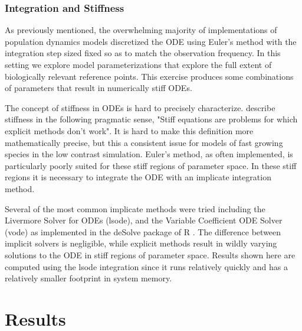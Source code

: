 \documentclass[12pt]{article}
\begin{document}
%
\subsubsection{Integration and Stiffness}

%
As previously mentioned, the overwhelming majority of implementations of
population dynamics models discretized the ODE using Euler's method with the
integration step sized fixed so as to match the observation frequency. In this
setting we explore model parameterizations that explore the full extent of
biologically relevant reference points. This exercise produces some
combinations of parameters that result in numerically stiff ODEs.

%
The concept of stiffness in ODEs is hard to precisely characterize.
 describe stiffness in the
following pragmatic sense, "Stiff equations are problems for which explicit
methods don't work". It is hard to make this definition more mathematically
precise, but this a consistent issue for models of fast growing species in 
the low contrast simulation. 
Euler's method, as often implemented, is particularly poorly suited for these 
stiff regions of parameter space. In these stiff regions it is necessary to 
integrate the ODE with an implicate integration method.

%
Several of the most common implicate methods were tried including the
Livermore Solver for ODEs (lsode), and the Variable Coefficient ODE Solver
(vode) as implemented in the deSolve package of R . 
The difference between implicit solvers is negligible, while explicit
methods result in wildly varying solutions to the ODE in stiff regions of
parameter space. %
Results shown here are computed using the lsode integration %
since it runs relatively quickly and has a relatively smaller footprint in system memory.



%
%

%
\clearpage

%
\vspace*{-1.5cm}
\section{Results}
\end{document}
